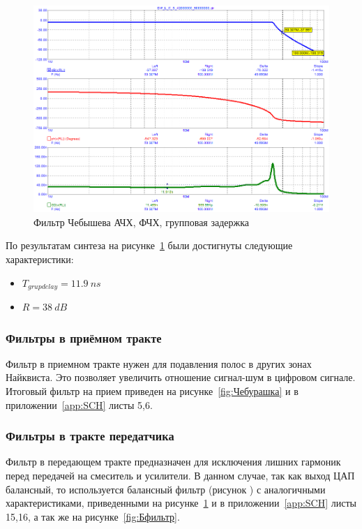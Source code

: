 \documentclass[utf8x, 14pt, oneside, a4paper]{article}
\begin{document}
		\begin{figure}
			\centering
			\includegraphics[width=1\linewidth]{"Зона найквиста"}
			\caption{Фильтр Чебышева АЧХ, ФЧХ, групповая задержка}
			\label{fig:Ф_АЧХ}
		\end{figure}
		 
		 По результатам синтеза на рисунке~\ref{fig:Ф_АЧХ} были достигнуты следующие характеристики:
		 \begin{itemize}
		 	\item $T_{grupdelay} = 11.9~ns$
		 	\item $R = 38~dB$
		 \end{itemize}

		

			\subsubsection{Фильтры в приёмном тракте}
			Фильтр в приемном тракте нужен для подавления полос в других зонах Найквиста. Это позволяет увеличить отношение сигнал-шум в цифровом сигнале. Итоговый фильтр на прием приведен на рисунке~\ref{fig:Чебурашка} и в приложении~\ref{app:SCH} листы 5,6.
			
			\subsubsection{Фильтры в тракте передатчика}
			Фильтр в передающем тракте предназначен для исключения лишних гармоник перед передачей на смеситель и усилители. В данном случае, так как выход ЦАП балансный, то используется балансный фильтр (рисунок ) с аналогичными характеристиками, приведенными на рисунке~\ref{fig:Ф_АЧХ} и в приложении~\ref{app:SCH} листы 15,16, а так же на рисунке~\ref{fig:Бфильтр}.
			
\end{document}
